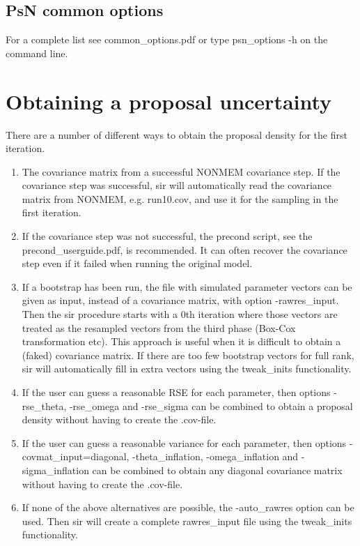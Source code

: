 \subsection{PsN common options}
For a complete list see common\_options.pdf or type psn\_options -h on the command line.
\section{Obtaining a proposal uncertainty}
There are a number of different ways to obtain the proposal density for the first iteration.
\begin{enumerate}
	\item The covariance matrix from a successful NONMEM covariance step. If the covariance step was successful, sir will automatically read the covariance matrix from NONMEM, e.g. run10.cov,  and use it for the sampling in the first iteration.
	\item If the covariance step was not successful, the precond script, see the precond\_userguide.pdf, is recommended. It can often recover the covariance step even if it failed when running the original model.
	\item If a bootstrap has been run, the file with simulated parameter vectors can be given as input, instead of a covariance matrix, with option -rawres\_input. Then the sir procedure starts with a 0th iteration where those vectors are treated as the resampled vectors from the third phase (Box-Cox transformation etc). This approach is useful when it is difficult to obtain a (faked) covariance matrix. If there are too few bootstrap vectors for full rank, sir will automatically fill in extra vectors using the tweak\_inits functionality.
	\item If the user can guess a reasonable RSE for each parameter, then options -rse\_theta, -rse\_omega and -rse\_sigma can be combined to obtain a proposal density without having to create the .cov-file. 
	\item If the user can guess a reasonable variance for each parameter, then options -covmat\_input=diagonal, -theta\_inflation, -omega\_inflation and -sigma\_inflation can be combined to obtain any diagonal covariance matrix
	without having to create the .cov-file.
	\item If none of the above alternatives are possible, the -auto\_rawres option can be used.	Then sir will create a complete rawres\_input file using the tweak\_inits functionality.
\end{enumerate}
